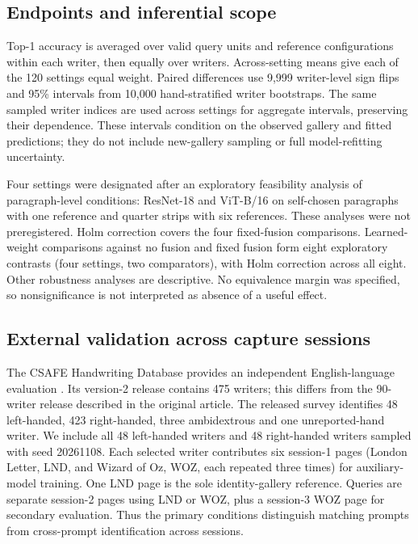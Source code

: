 \documentclass[ASNA,twocolumn]{USG}
\begin{document}
\subsection{Endpoints and inferential scope}
\label{sec:statistics}
Top-1 accuracy is averaged over valid query units and reference configurations within each writer, then equally over writers. Across-setting means give each of the 120 settings equal weight. Paired differences use 9,999 writer-level sign flips and 95\% intervals from 10,000 hand-stratified writer bootstraps. The same sampled writer indices are used across settings for aggregate intervals, preserving their dependence. These intervals condition on the observed gallery and fitted predictions; they do not include new-gallery sampling or full model-refitting uncertainty.

Four settings were designated after an exploratory feasibility analysis of paragraph-level conditions: ResNet-18 and ViT-B/16 on self-chosen paragraphs with one reference and quarter strips with six references. These analyses were not preregistered. Holm correction covers the four fixed-fusion comparisons. Learned-weight comparisons against no fusion and fixed fusion form eight exploratory contrasts (four settings, two comparators), with Holm correction across all eight. Other robustness analyses are descriptive. No equivalence margin was specified, so nonsignificance is not interpreted as absence of a useful effect.


\subsection{External validation across capture sessions}
\label{sec:csafemethods}
The CSAFE Handwriting Database provides an independent English-language evaluation \cite{crawford2020database,crawford2026csafe}. Its version-2 release contains 475 writers; this differs from the 90-writer release described in the original article. The released survey identifies 48 left-handed, 423 right-handed, three ambidextrous and one unreported-hand writer. We include all 48 left-handed writers and 48 right-handed writers sampled with seed 20261108. Each selected writer contributes six session-1 pages (London Letter, LND, and Wizard of Oz, WOZ, each repeated three times) for auxiliary-model training. One LND page is the sole identity-gallery reference. Queries are separate session-2 pages using LND or WOZ, plus a session-3 WOZ page for secondary evaluation. Thus the primary conditions distinguish matching prompts from cross-prompt identification across sessions.
\end{document}
